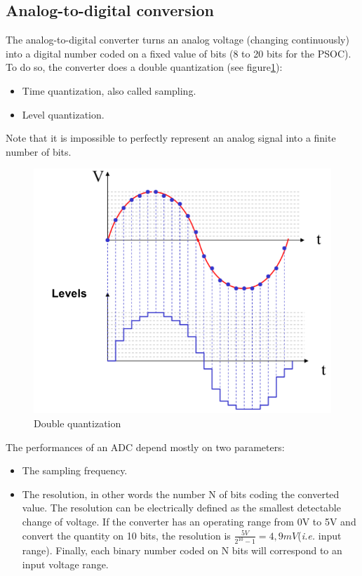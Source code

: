\documentclass[11pt,a4paper]{article}
\theoremstyle{definition}%
\begin{document}
\subsection{Analog-to-digital conversion}
The analog-to-digital converter turns an analog voltage (changing continuously) into a digital number coded on a fixed value of bits (8 to 20 bits for the PSOC).
To do so, the converter does a double quantization (see figure\ref{fig:double-quant}):
\begin{itemize}
	\item Time quantization, also called sampling.
	\item Level quantization.
\end{itemize}
Note that it is impossible to perfectly represent an analog signal into a finite number of bits.

\begin{figure}[H]
	\centering
	\includegraphics[width=.7\textwidth]{ENdouble-quant}
	\caption{Double quantization}
	\label{fig:double-quant}
\end{figure}

The performances of an ADC depend mostly on two parameters:
\begin{itemize}
	\item The sampling frequency.
	\item The resolution, in other words the number N of bits coding the converted value.
    The resolution can be electrically defined as the smallest detectable change of voltage.
    If the converter has an operating range from 0V to 5V and convert the quantity on 10 bits, the resolution is $\frac{5 V}{2^{10}-1} = 4,9 mV$(\textit{i.e.} input range).
    Finally, each binary number coded on N bits will correspond to an input voltage range.

\end{itemize}
\end{document}
